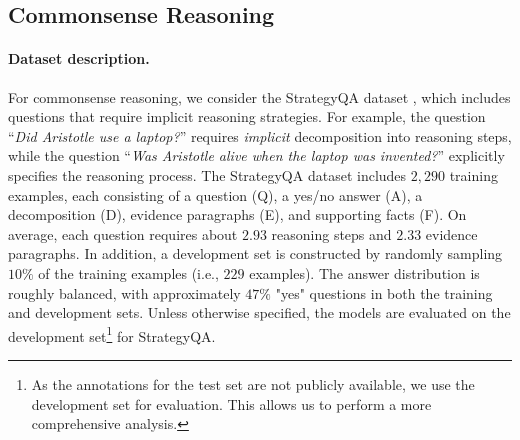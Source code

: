 \subsection{Commonsense Reasoning}
\label{subsec:commonsense}

\paragraph{Dataset description.} For commonsense reasoning, we consider the StrategyQA dataset \cite{geva2021did}, which includes questions that require implicit reasoning strategies. For example, the question ``\textit{Did Aristotle use a laptop?}'' requires \textit{implicit} decomposition into reasoning steps, while the question ``\textit{Was Aristotle alive when the laptop was invented?}'' explicitly specifies the reasoning process. The StrategyQA dataset includes $2,290$ training examples, each consisting of a question (Q), a yes/no answer (A), a decomposition (D), evidence paragraphs (E), and supporting facts (F). On average, each question requires about $2.93$ reasoning steps and $2.33$ evidence paragraphs. In addition, a development set is constructed by randomly sampling $10\%$ of the training examples (i.e., $229$ examples). The answer distribution is roughly balanced, with approximately $47\%$ "yes" questions in both the training and development sets. Unless otherwise specified, the models are evaluated on the development set\footnote{As the annotations for the test set are not publicly available, we use the development set for evaluation. This allows us to perform a more comprehensive analysis.} for StrategyQA.

\begin{table*}[t]
\centering
{}
\caption{Performance of different methods using GPT-3 on three reasoning tasks.
}
\label{table:gpt3-results}
\end{table*}


